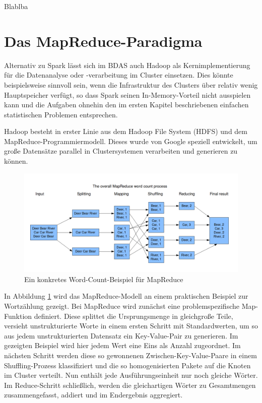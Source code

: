 Blablba

\section{Das MapReduce-Paradigma}
\label{section:das mapreduce-paradigma}

Alternativ zu Spark lässt sich im BDAS auch Hadoop als Kernimplementierung für die Datenanalyse oder -verarbeitung im Cluster einsetzen. Dies könnte beispielsweise sinnvoll sein, wenn die Infrastruktur des Clusters über relativ wenig Hauptspeicher verfügt, so dass Spark seinen In-Memory-Vorteil nicht ausspielen kann und die Aufgaben ohnehin den im ersten Kapitel beschriebenen einfachen statistischen Problemen entsprechen. 
 
Hadoop besteht in erster Linie aus dem Hadoop File System (HDFS) und dem MapReduce-Programmiermodell. Dieses wurde von Google speziell entwickelt, um große Datensätze parallel in Clustersystemen verarbeiten und generieren zu können. 

\begin{figure}[htb!]
\centering
\includegraphics[width=1.0\textwidth]{bilder/2_6_1_wordcount.png}
\caption{Ein konkretes Word-Count-Beispiel für MapReduce  \protect{}}
\label{fig:wordcount}
\end{figure}   
 


In Abbildung \ref{fig:wordcount} wird das MapReduce-Modell an einem praktischen Beispiel zur Wortzählung gezeigt. Bei MapReduce wird zunächst eine problemspezifische Map-Funktion definiert. Diese splittet die Ursprungsmenge in gleichgroße Teile, versieht unstrukturierte Worte in einem ersten Schritt mit Standardwerten, um so aus jedem unstrukturierten Datensatz ein Key-Value-Pair zu generieren. Im gezeigten Beispiel wird hier jedem Wert eine Eins als Anzahl zugeordnet. Im nächsten Schritt werden diese so gewonnenen Zwischen-Key-Value-Paare in einem Shuffling-Prozess klassifiziert und die so homogenisierten Pakete auf die Knoten im Cluster verteilt. Nun enthält jede Ausführungseinheit nur noch gleiche Wörter. Im Reduce-Schritt schließlich, werden die gleichartigen Wörter zu Gesamtmengen zusammengefasst, addiert und im Endergebnis aggregiert. 

